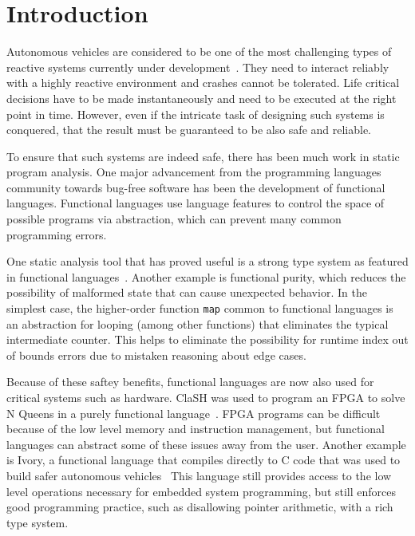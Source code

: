 \section{Introduction}

Autonomous vehicles are considered to be one of the most challenging types of reactive systems currently under 
development~\cite{AlurMT16, WongpiromsarnKF11, RamanDSMS15}. 
They need to interact reliably with a highly reactive environment and crashes cannot be tolerated.
Life critical decisions have to be made instantaneously and need to be executed at the right point in time. 
However, even if the intricate task of designing such systems is conquered, that the result must be guaranteed to be also safe and reliable.

To ensure that such systems are indeed safe, there has been much work in static program analysis.
One major advancement from the programming languages community towards bug-free software has been the development of functional languages.
Functional languages use language features to control the space of possible programs via abstraction, which can prevent many common programming errors.

One static analysis tool that has proved useful is a strong type system as featured in functional languages~\cite{cardelli1996type}.
Another example is functional purity, which reduces the possibility of malformed state that can cause unexpected behavior.
In the simplest case, the higher-order function \texttt{map} common to functional languages is an abstraction for looping (among other functions) that eliminates the typical intermediate counter.
This helps to eliminate the possibility for runtime index out of bounds errors due to mistaken reasoning about edge cases.

Because of these saftey benefits, functional languages are now also used for critical systems such as hardware.
ClaSH was used to program an FPGA to solve N Queens in a purely functional language~\cite{clash2014}.
FPGA programs can be difficult because of the low level memory and instruction management, but functional languages can abstract some of these issues away from the user.
Another example is Ivory, a functional language that compiles directly to C code that was used to build safer autonomous vehicles~\cite{pike2014}
This language still provides access to the low level operations necessary for embedded system programming, but still enforces good programming practice, such as disallowing pointer arithmetic, with a rich type system.

